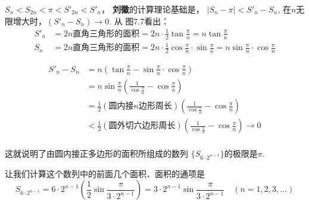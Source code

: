 $S_n<S_{2n}<\pi<S'_{2n}<S'_n$， 
\textbf{刘徽}的计算理论基础是，
$|S_n-\pi|<S'_n-S_n$, 在$n$无限增大时，$(S'_n-S_n)\to 0$. 从
图7.7看出：
\[\begin{split}
    S'_n&=2n\text{直角三角形的面积}=2n\cdot \frac{1}{2}\tan\frac{\pi}{n}=n\tan\frac{\pi}{n}   \\
    S_n&=2n\text{直角三角形的面积}=2n\cdot \frac{1}{2}\cos\frac{\pi}{n}\cdot \sin \frac{\pi}{n}=n\sin\frac{\pi}{n}\cdot \cos\frac{\pi}{n}
\end{split}\]

\[\begin{split}
    S'_n-S_n &= n\left(\tan\frac{\pi}{n}-\sin\frac{\pi}{n}\cdot \cos\frac{\pi}{n}\right)\\
    &=n \sin\frac{\pi}{n}\left(\frac{1}{\cos\frac{\pi}{n}}-\cos\frac{\pi}{n}\right)\\
    &=\frac{1}{2}(\text{圆内接$n$边形周长})\left(\frac{1}{\cos\frac{\pi}{n}}-\cos\frac{\pi}{n}\right)\\
    &<\frac{1}{2}(\text{圆外切六边形周长})\left(\frac{1}{\cos\frac{\pi}{n}}-\cos\frac{\pi}{n}\right)\to 0\\
\end{split} \]

这就说明了由圆内接正多边形的面积所组成的数列
$\{S_{6\cdot 2^{n-1}}\}$的极限是$\pi$. 

让我们计算这个数列中的前面几个面积．面积的通项是
\[S_{6\cdot 2^{n-1}}=6\cdot 2^{n-1}\left(\frac{1}{2}\sin\frac{\pi}{3\cdot 2^{n-1}}\right)=3\cdot 2^{n-1}\sin\frac{\pi}{3\cdot 2^{n-1}}\quad (n=1,2,3,\ldots)\]


